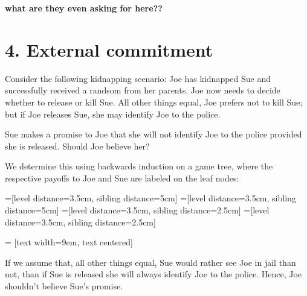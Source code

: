 \documentclass{article}
\begin{document}
\textbf{what are they even asking for here??}

\section*{4. External commitment}

Consider the following kidnapping scenario: Joe has kidnapped Sue and
successfully received a randsom from her parents. Joe now needs to
decide whether to release or kill Sue. All other things equal, Joe
prefers not to kill Sue; but if Joe releases Sue, she may identify Joe
to the police.

Sue makes a promise to Joe that she will not identify Joe to the police
provided she is released. Should Joe believe her?

We determine this using backwards induction on a game tree, where the
respective payoffs to Joe and Sue are labeled on the leaf nodes:

=[level distance=3.5cm, sibling distance=5cm]
=[level distance=3.5cm, sibling distance=5cm]
=[level distance=3.5cm, sibling distance=2.5cm]
=[level distance=3.5cm, sibling distance=2.5cm]

 = [text width=9em, text centered]

\begin{center}
\end{center}

If we assume that, all other things equal, Sue would rather see Joe in
jail than not, than if Sue is released she will always identify Joe to
the police. Hence, Joe shouldn't believe Sue's promise.
\end{document}
